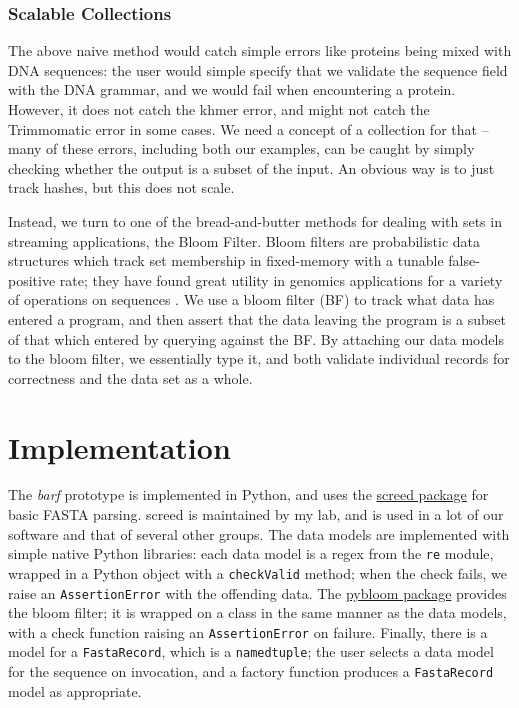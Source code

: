 \documentclass[12pt]{article} %
\begin{document}
\subsubsection{Scalable Collections}

The above naive method would catch simple errors like proteins being mixed with 
DNA sequences: the user would simple specify that we validate the sequence field with
the DNA grammar, and we would fail when encountering a protein. However, it does not
catch the khmer error, and might not catch the Trimmomatic error in some cases.
We need a concept of a collection for that -- many of these errors, including both
our examples, can be caught by simply checking whether the output is a subset of
the input. An obvious way is to just track hashes, but this does not scale.

Instead, we turn to one of the bread-and-butter methods for dealing with sets
in streaming applications, the Bloom Filter. Bloom filters are probabilistic data structures
which track set membership in fixed-memory with a tunable false-positive rate; they
have found great utility in genomics applications for a variety of operations on 
sequences \citep{chikhi_space-efficient_2013}\citep{pell_scaling_2012}. We use
a bloom filter (BF) to track what data has entered a program, and then assert that the 
data leaving the program is a subset of that which entered by querying against the BF. 
By attaching our data models to the bloom filter, we essentially type it, and both
validate individual records for correctness and the data set as a whole.

\section{Implementation}

The \emph{barf} prototype is implemented in Python, and uses the 
\href{https://github.com/dib-lab/screed}{screed package} for basic FASTA parsing.
screed is maintained by my lab, and is used in a lot of our software and that of
several other groups. The data models are implemented with simple native Python
libraries: each data model is a regex from the \texttt{re} module, wrapped
in a Python object with a \texttt{checkValid} method; when the check fails, we
raise an \texttt{AssertionError} with the offending data. The \href{https://github.com/jaybaird/python-bloomfilter}{pybloom package}
provides the bloom filter; it is wrapped on a class in the same manner as the data 
models, with a check function raising an \texttt{AssertionError} on failure. Finally, there
is a model for a \texttt{FastaRecord}, which is a \texttt{namedtuple}; the user
selects a data model for the sequence on invocation, and a factory function produces
a \texttt{FastaRecord} model as appropriate.
\end{document}
